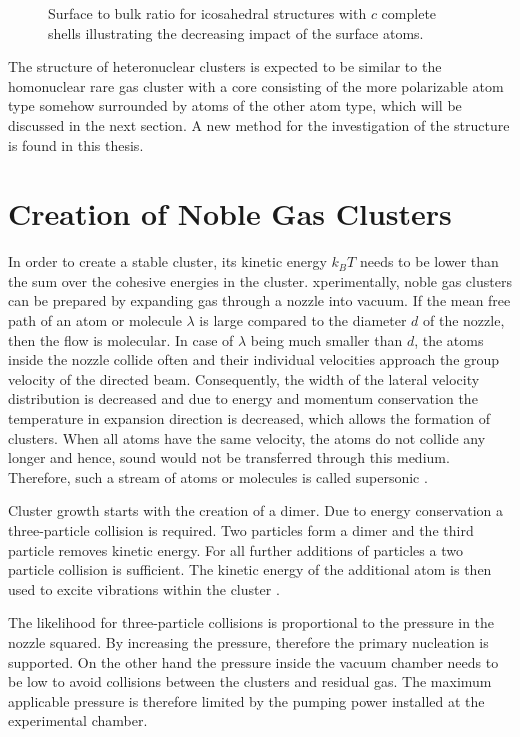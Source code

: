 \begin{figure}[h]
 \centering
 
 \caption{Surface to bulk ratio for icosahedral structures with $c$ complete
          shells illustrating the decreasing impact of the surface atoms.}
 \label{figure:surface_to_bulk}
\end{figure}

The structure of heteronuclear clusters is expected to be similar to the
homonuclear rare gas cluster with a core consisting of the more polarizable
atom type somehow surrounded by atoms of the other atom type, which will be discussed
in the next section. 
A new method for the investigation of the structure is found
in this thesis.


\section{Creation of Noble Gas Clusters}
In order to create a stable cluster, its kinetic energy $k_BT$ needs to be lower
than the sum over the cohesive energies in the cluster.
xperimentally, noble gas clusters can be prepared by expanding gas
through a nozzle into vacuum.
If the mean free path of an atom or molecule
$\lambda$ is large compared to the diameter $d$ of the nozzle, then the flow is
molecular. In case of $\lambda$ being much smaller than $d$, the atoms inside
the nozzle collide often and their individual velocities approach the group
velocity of the directed beam.
Consequently, the width of the lateral velocity
distribution is decreased and due to energy and momentum conservation the temperature
in expansion direction is decreased, which allows the formation of clusters.
When all atoms have the same velocity, the atoms do not collide any longer
and hence, sound would not be transferred through this medium. Therefore,
such a stream of atoms or molecules is called supersonic \cite{Moore09}.

Cluster growth starts with the creation of a dimer. Due to energy conservation
a three-particle collision is required. Two particles form a dimer and the
third particle removes kinetic energy. For all further additions of particles
a two particle collision is sufficient. The kinetic energy of the additional
atom is then used to excite vibrations within the cluster \cite{Soler82}.

The likelihood for three-particle collisions is proportional to the pressure
in the nozzle squared. By increasing the pressure, therefore the 
primary nucleation is supported. On the other hand the 
pressure inside the vacuum chamber needs to be low to avoid collisions
between the clusters and residual gas. The maximum applicable pressure is
therefore limited by the pumping power installed at the experimental chamber.

